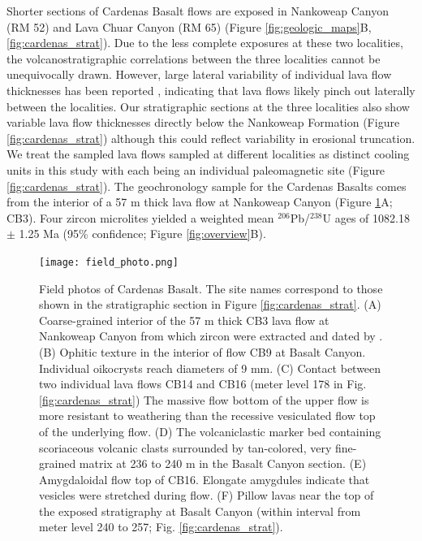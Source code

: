 \documentclass[draft]{agujournal2019}
\begin{document}
Shorter sections of Cardenas Basalt flows are exposed in Nankoweap Canyon (RM 52) and Lava Chuar Canyon (RM 65) (Figure \ref{fig:geologic_maps}B, \ref{fig:cardenas_strat}). Due to the less complete exposures at these two localities, the volcanostratigraphic correlations between the three localities cannot be unequivocally drawn. However, large lateral variability of individual lava flow thicknesses has been reported \cite{Lucchitta1983a}, indicating that lava flows likely pinch out laterally between the localities. Our stratigraphic sections at the three localities also show variable lava flow thicknesses directly below the Nankoweap Formation (Figure \ref{fig:cardenas_strat}) although this could reflect variability in erosional truncation. We treat the sampled lava flows sampled at different localities as distinct cooling units in this study with each being an individual paleomagnetic site (Figure \ref{fig:cardenas_strat}). The  geochronology sample for the Cardenas Basalts comes from the interior of a 57 m thick lava flow at Nankoweap Canyon (Figure \ref{fig:field_photo}A; CB3). Four zircon microlites yielded a weighted mean $^{206}$Pb/$^{238}$U ages of 1082.18 $\pm$ 1.25 Ma (95\% confidence; Figure \ref{fig:overview}B). 


\begin{figure}[h!]
\centering
\texttt{[image: field\_photo.png]}
\caption{Field photos of Cardenas Basalt. The site names correspond to those shown in the stratigraphic section in Figure \ref{fig:cardenas_strat}. (A) Coarse-grained interior of the 57 m thick CB3 lava flow at Nankoweap Canyon from which zircon were extracted and dated by . (B) Ophitic texture in the interior of flow CB9 at Basalt Canyon. Individual oikocrysts reach diameters of 9 mm. (C) Contact between two individual lava flows CB14 and CB16 (meter level 178 in Fig. \ref{fig:cardenas_strat}) The massive flow bottom of the upper flow is more resistant to weathering than the recessive vesiculated flow top of the underlying flow. (D) The volcaniclastic marker bed containing scoriaceous volcanic clasts surrounded by tan-colored, very fine-grained matrix at 236 to 240 m in the Basalt Canyon section. (E) Amygdaloidal flow top of CB16. Elongate amygdules indicate that vesicles were stretched during flow. (F) Pillow lavas near the top of the exposed stratigraphy at Basalt Canyon (within interval from meter level 240 to 257; Fig. \ref{fig:cardenas_strat}). }
\label{fig:field_photo}
\end{figure}
\end{document}

